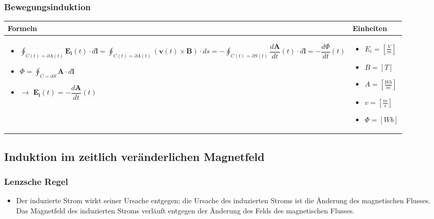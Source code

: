 \subsubsection{Bewegungsinduktion}
\begin{tabular}{ | m{15cm} | m{3cm}  | }
	\hline
	Formeln & Einheiten \\ \hline
	\hline
	\begin{itemize}
		\item $\displaystyle\oint_{C(t)=\partial A(t)}\mathbf{E_i}(t)\cdot d\mathbf{l}=\displaystyle\oint_{C(t)=\partial A(t)}(\mathbf{v}(t)\times \mathbf{B})\cdot ds=-\displaystyle\oint_{C(t)=\partial S(t)}\dfrac{d\mathbf{A}}{dt}(t)\cdot d\mathbf{l}=-\dfrac{d\Phi}{dt}(t)$
		\item[] $\Phi=\displaystyle\oint_{C=\partial S}\mathbf{A}\cdot d\mathbf{l}$
		\item[] $\rightarrow$ $\mathbf{E_i}(t)=-\dfrac{d\mathbf{A}}{dt}(t)$
	\end{itemize} 
	&   	
	\begin{itemize}
		\item[] $E_i=[\frac{V}{m}]$
		\item[] $B=[T]$
		\item[]	$A=[\frac{Wb}{m}]$
		\item[]	$v=[\frac{m}{s}]$
		\item[] $\Phi=[Wb]$
	\end{itemize} 
	\\ \hline
\end{tabular}

\subsection{Induktion im zeitlich veränderlichen Magnetfeld}

\subsubsection{Lenzsche Regel}
\begin{itemize}
	\item[] Der induzierte Strom wirkt seiner Ursache entgegen; die Ursache des induzierten Stroms ist die Änderung des magnetischen Flusses. Das Magnetfeld des induzierten Stroms verläuft entgegen der Änderung des Felds des magnetischen Flusses.
\end{itemize} 

